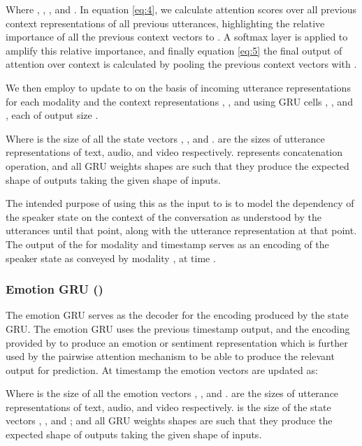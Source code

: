 \documentclass[11pt,a4paper]{article}
\begin{document}
Where , , , and . In equation \ref{eq:4}, we calculate attention scores over all previous context representations of all previous utterances, highlighting the relative importance of all the previous context vectors to . A softmax layer is applied to amplify this relative importance, and finally equation \ref{eq:5} the final output of attention over context  is calculated by pooling the previous context vectors with .

We then employ  to update  to  on the basis of incoming utterance representations for each modality  and the context representations , , and  using GRU cells , , and , each of output size .







Where  is the size of all the state vectors , , and . are the sizes of utterance representations of text, audio, and video respectively. represents concatenation operation, and all GRU weights shapes are such that they produce the expected shape of outputs taking the given shape of inputs.

The intended purpose of using this as the input to  is to model the dependency of the speaker state on the context of the conversation as understood by the utterances until that point, along with the utterance representation at that point. The output of the  for modality  and timestamp  serves as an encoding of the speaker state as conveyed by modality , at time .

\subsubsection{Emotion GRU ()}

The emotion GRU serves as the decoder for the encoding produced by the state GRU. The emotion GRU uses the previous timestamp  output, and the encoding provided by  to produce an emotion or sentiment representation which is further used by the pairwise attention mechanism to be able to produce the relevant output for prediction. At timestamp  the emotion vectors are updated as:







Where  is the size of all the emotion vectors , , and . are the sizes of utterance representations of text, audio, and video respectively. is the size of the state vectors , , and ; and all GRU weights shapes are such that they produce the expected shape of outputs taking the given shape of inputs. 
\end{document}
